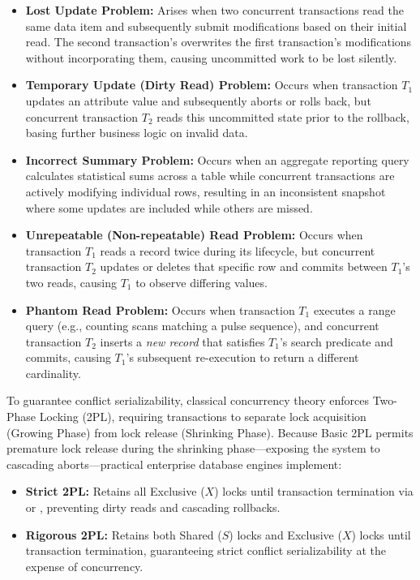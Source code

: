 \begin{itemize}
    \item \textbf{Lost Update Problem:} Arises when two concurrent transactions read the same data item and subsequently submit modifications based on their initial read. The second transaction's  overwrites the first transaction's modifications without incorporating them, causing uncommitted work to be lost silently.
    \item \textbf{Temporary Update (Dirty Read) Problem:} Occurs when transaction $T_1$ updates an attribute value and subsequently aborts or rolls back, but concurrent transaction $T_2$ reads this uncommitted state prior to the rollback, basing further business logic on invalid data.
    \item \textbf{Incorrect Summary Problem:} Occurs when an aggregate reporting query calculates statistical sums across a table while concurrent transactions are actively modifying individual rows, resulting in an inconsistent snapshot where some updates are included while others are missed.
    \item \textbf{Unrepeatable (Non-repeatable) Read Problem:} Occurs when transaction $T_1$ reads a record twice during its lifecycle, but concurrent transaction $T_2$ updates or deletes that specific row and commits between $T_1$'s two reads, causing $T_1$ to observe differing values.
    \item \textbf{Phantom Read Problem:} Occurs when transaction $T_1$ executes a range query (e.g., counting scans matching a pulse sequence), and concurrent transaction $T_2$ inserts a \textit{new record} that satisfies $T_1$'s search predicate and commits, causing $T_1$'s subsequent re-execution to return a different cardinality.
\end{itemize}

To guarantee conflict serializability, classical concurrency theory enforces Two-Phase Locking (2PL), requiring transactions to separate lock acquisition (Growing Phase) from lock release (Shrinking Phase). Because Basic 2PL permits premature lock release during the shrinking phase—exposing the system to cascading aborts—practical enterprise database engines implement:
\begin{itemize}
    \item \textbf{Strict 2PL:} Retains all Exclusive ($X$) locks until transaction termination via  or , preventing dirty reads and cascading rollbacks.
    \item \textbf{Rigorous 2PL:} Retains both Shared ($S$) locks and Exclusive ($X$) locks until transaction termination, guaranteeing strict conflict serializability at the expense of concurrency.
\end{itemize}



